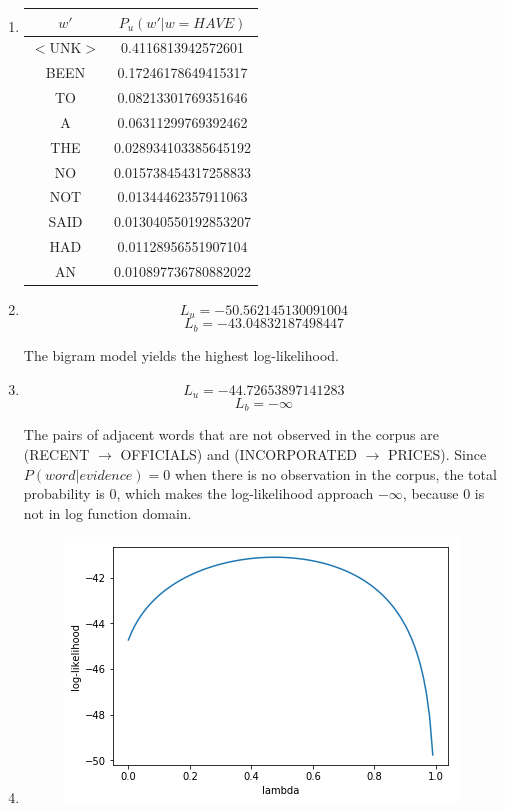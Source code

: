 \documentclass[11]{article}
\makeatletter
\def\maxwidth{\ifdim\Gin@nat@width>\linewidth\linewidth
    \else\Gin@nat@width\fi}
\let\Oldincludegraphics\includegraphics
\renewcommand{\includegraphics}[1]{\Oldincludegraphics[width=.8\maxwidth]{#1}}
\makeatother
\begin{document}
\begin{enumerate}[label=(\alph*)]
\item
\begin{center}
\begin{tabular}{|c|c|}
\hline
\textbf{$w'$} & \textbf{$P_u(w'|w=HAVE)$} \\ \hline
$<$UNK$>$         & 0.4116813942572601        \\ \hline
BEEN          & 0.17246178649415317       \\ \hline
TO            & 0.08213301769351646       \\ \hline
A             & 0.06311299769392462       \\ \hline
THE           & 0.028934103385645192      \\ \hline
NO            & 0.015738454317258833      \\ \hline
NOT           & 0.01344462357911063       \\ \hline
SAID          & 0.013040550192853207      \\ \hline
HAD           & 0.01128956551907104       \\ \hline
AN            & 0.010897736780882022      \\ \hline
\end{tabular}
\end{center}

\item
$$L_u=-50.562145130091004$$
$$L_b=-43.04832187498447$$

The bigram model yields the highest log-likelihood.
\item
$$L_u=-44.72653897141283$$
$$L_b=-\infty$$

The pairs of adjacent words that are not observed in the corpus are (RECENT $\rightarrow$ OFFICIALS) and (INCORPORATED $\rightarrow$ PRICES). Since $P(word|evidence)=0$ when there is no observation in the corpus, the total probability is 0, which makes the log-likelihood approach $-\infty$, because 0 is not in log function domain.

\item
\begin{figure}
\centering
  \includegraphics{log-likelihood.png}
\end{figure}


\end{enumerate}
\end{document}
